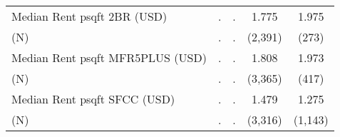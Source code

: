\begin{tabular}{l*{4}{c}}
Median Rent psqft 2BR (USD)&           .&           .&       1.775&       1.975\\
(N)         &           .&           .&        (2,391)&         (273)\\
Median Rent psqft MFR5PLUS (USD)&           .&           .&       1.808&       1.973\\
(N)         &           .&           .&        (3,365)&         (417)\\
Median Rent psqft SFCC (USD)&           .&           .&       1.479&       1.275\\
(N)         &           .&           .&        (3,316)&        (1,143)\\
\hline\hline
\end{tabular}
